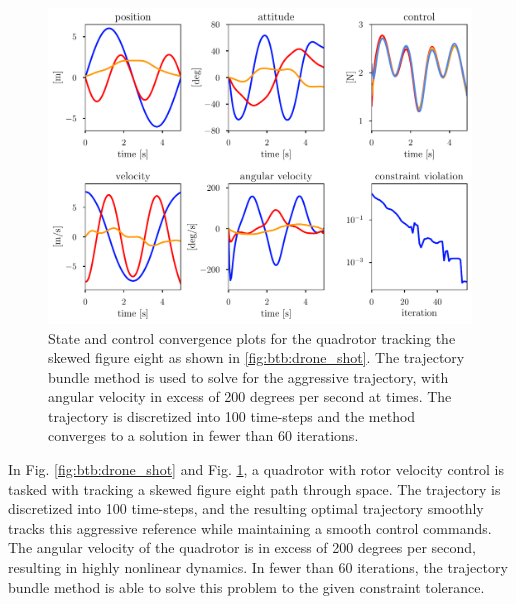 \begin{figure}
    \centering
    \includegraphics[width=0.9\linewidth]{bundles/examples/drone_fig.pdf}
    \caption{State and control convergence plots for the quadrotor tracking the skewed figure eight as shown in \ref{fig:btb:drone_shot}. The trajectory bundle method is used to solve for the aggressive trajectory, with angular velocity in excess of 200 degrees per second at times. The trajectory is discretized into 100 time-steps and the method converges to a solution in fewer than 60 iterations.}
    \label{fig:btb:drone}
\end{figure}


In Fig. \ref{fig:btb:drone_shot} and Fig. \ref{fig:btb:drone}, a quadrotor with rotor velocity control is tasked with tracking a skewed figure eight path through space. The trajectory is discretized into 100 time-steps, and the resulting optimal trajectory smoothly tracks this aggressive reference while maintaining a smooth control commands. The angular velocity of the quadrotor is in excess of 200 degrees per second, resulting in highly nonlinear dynamics. In fewer than 60 iterations, the trajectory bundle method is able to solve this problem to the given constraint tolerance. 


